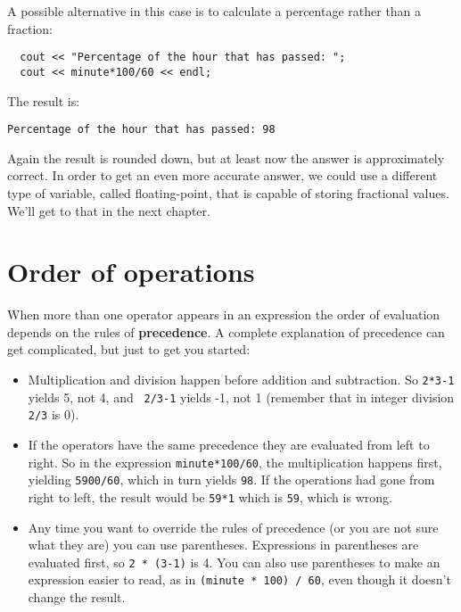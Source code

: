 A possible alternative in this case is to calculate a percentage
rather than a fraction:

\begin{verbatim}
  cout << "Percentage of the hour that has passed: ";
  cout << minute*100/60 << endl;
\end{verbatim}
%
The result is:

\begin{verbatim}
Percentage of the hour that has passed: 98
\end{verbatim}
%
Again the result is rounded down, but at least now the answer
is approximately correct.  In order to get an even more accurate
answer, we could use a different type of variable, called
floating-point, that is capable of storing fractional values.
We'll get to that in the next chapter.

\section{Order of operations}

When more than one operator appears in an expression the order
of evaluation depends on the rules of {\bf precedence}.  A
complete explanation of precedence can get complicated, but
just to get you started:

\begin{itemize}

\item Multiplication and division happen before
addition and subtraction.  So {\tt 2*3-1} yields 5, not 4, and {\tt
2/3-1} yields -1, not 1 (remember that in integer division {\tt 2/3}
is 0).

\item If the operators have the same precedence they are evaluated
from left to right.  So in the expression {\tt minute*100/60},
the multiplication happens first, yielding {\tt 5900/60}, which
in turn yields {\tt 98}.  If the operations had gone from right
to left, the result would be {\tt 59*1} which is {\tt 59}, which
is wrong.

\item Any time you want to override the rules of precedence (or
you are not sure what they are) you can use parentheses.  Expressions
in parentheses are evaluated first, so {\tt 2 * (3-1)} is 4.
You can also use parentheses to make an expression easier to
read, as in {\tt (minute * 100) / 60}, even though it doesn't
change the result.

\end{itemize}

